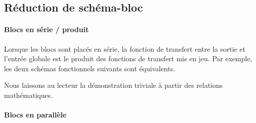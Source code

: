 \subsection{Réduction de schéma-bloc}

\paragraph{Blocs en série / produit}
Lorsque les blocs sont placés en série, la fonction de transfert 
entre la sortie et l'entrée globale est le produit des fonctions de 
transfert mis en jeu. Par exemple, les deux schémas fonctionnels suivants 
sont équivalents.

\begin{center}

\end{center}

Nous laissons au lecteur la démonstration triviale à partir des relations 
mathématiques.


\paragraph{Blocs en parallèle} 

